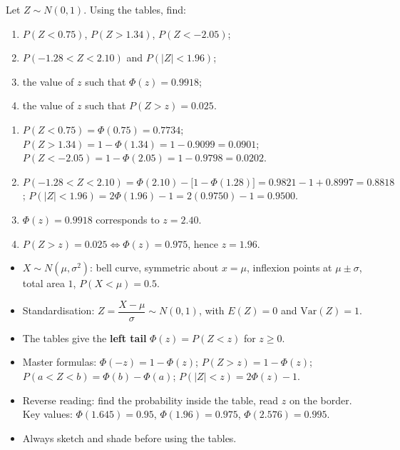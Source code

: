\documentclass[11pt]{article}
\begin{document}
\begin{exercice}[Practice]
Let $Z \sim N(0,1)$. Using the tables, find:
\begin{enumerate}
\item $P(Z < 0.75)$, $P(Z > 1.34)$, $P(Z < -2.05)$;
\item $P(-1.28 < Z < 2.10)$ and $P(|Z| < 1.96)$;
\item the value of $z$ such that $\Phi(z) = 0.9918$;
\item the value of $z$ such that $P(Z > z) = 0.025$.
\end{enumerate}
\end{exercice}

\begin{corrige}[Exercise 1]
\begin{enumerate}
\item $P(Z<0.75) = \Phi(0.75) = 0.7734$; \quad $P(Z>1.34) = 1 - \Phi(1.34) = 1 - 0.9099 = 0.0901$; \quad $P(Z<-2.05) = 1 - \Phi(2.05) = 1 - 0.9798 = 0.0202$.
\item $P(-1.28<Z<2.10) = \Phi(2.10) - \bigl[1-\Phi(1.28)\bigr] = 0.9821 - 1 + 0.8997 = 0.8818$; \quad $P(|Z|<1.96) = 2\Phi(1.96) - 1 = 2(0.9750) - 1 = 0.9500$.
\item $\Phi(z) = 0.9918$ corresponds to $z = 2.40$.
\item $P(Z > z) = 0.025 \iff \Phi(z) = 0.975$, hence $z = 1.96$.
\end{enumerate}
\end{corrige}

\begin{aretenir}
\begin{itemize}
\item $X \sim N(\mu, \sigma^2)$: bell curve, symmetric about $x=\mu$, inflexion points at $\mu \pm \sigma$, total area $1$, $P(X<\mu) = 0.5$.
\item Standardisation: $Z = \dfrac{X-\mu}{\sigma} \sim N(0,1)$, with $E(Z)=0$ and $\mathrm{Var}(Z)=1$.
\item The tables give the \textbf{left tail} $\Phi(z) = P(Z<z)$ for $z \geq 0$.
\item Master formulas: $\Phi(-z) = 1-\Phi(z)$; $P(Z>z) = 1-\Phi(z)$; $P(a<Z<b) = \Phi(b)-\Phi(a)$; $P(|Z|<z) = 2\Phi(z)-1$.
\item Reverse reading: find the probability inside the table, read $z$ on the border. Key values: $\Phi(1.645)=0.95$, $\Phi(1.96)=0.975$, $\Phi(2.576)=0.995$.
\item Always sketch and shade before using the tables.
\end{itemize}
\end{aretenir}
\end{document}
